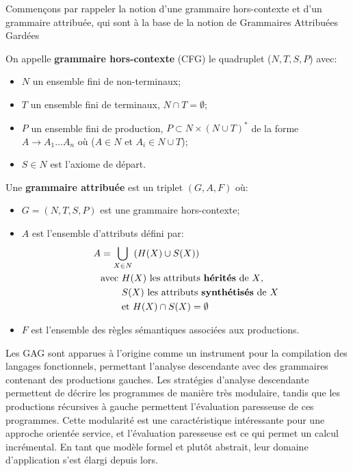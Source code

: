 Commençons par rappeler la notion d'une grammaire hors-contexte et d'un grammaire attribuée, qui sont à la base de la notion de Grammaires Attribuées Gardées 
\begin{definition}
    On appelle \textbf{grammaire hors-contexte} (CFG) le quadruplet ($N,T,S,P$) avec:
    \begin{itemize}
        \item $N$ un ensemble fini de non-terminaux;
        \item $T$ un ensemble fini de terminaux, $N \cap T = \emptyset$;
        \item $P$ un ensemble fini de production, $P \subset N \times (N \cup T)^*$ de la forme $A \rightarrow A_1 \ldots A_n$ où ($A \in N$ et $A_i \in N \cup T$);
        \item $S \in N$ est l'axiome de départ.
    \end{itemize}
\end{definition}
\begin{definition}
    Une \textbf{grammaire attribuée} est un triplet $(G, A, F)$ où:
    \begin{itemize}
        \item $G = (N, T, S, P)$ est une grammaire hors-contexte;
        \item $A$ est l'ensemble d'attributs défini par: 
            \begin{align}
                A &= \bigcup_{X \in N} \left( H(X) \cup S(X) \right) \\
                &\text{avec } H(X) \text{ les attributs \textbf{hérités} de $X$}, \nonumber \\
                &\phantom{\text{avec }} S(X) \text{ les attributs \textbf{synthétisés} de $X$} \nonumber \\
                &\phantom{\text{avec }} \text{et } H(X) \cap S(X) = \emptyset \nonumber
            \end{align}
        \item $F$ est l'ensemble des règles sémantiques associées aux productions.
    \end{itemize}
\end{definition}
Les GAG sont apparues à l'origine comme un instrument pour la compilation des langages fonctionnels, permettant l'analyse descendante avec des grammaires contenant des productions gauches. Les stratégies d'analyse descendante permettent de décrire les programmes de manière très modulaire, tandis que les productions récursives à gauche permettent l'évaluation paresseuse de ces programmes. Cette modularité est une caractéristique intéressante pour une approche orientée service, et l'évaluation paresseuse est ce qui permet un calcul incrémental. En tant que modèle formel et plutôt abstrait, leur domaine d'application s'est élargi depuis lors.


